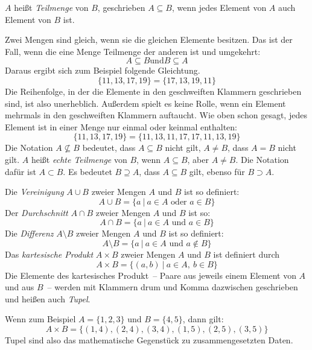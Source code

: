 $A$ heißt \textit{Teilmenge} von $B$, geschrieben $A \subseteq B$, 
wenn jedes Element von $A$ auch Element von $B$ ist.

Zwei Mengen sind gleich, wenn sie die gleichen Elemente besitzen.  Das
ist der Fall, wenn die eine Menge Teilmenge der anderen ist und umgekehrt:
%
\[A \subseteq B \text{und} B \subseteq A\]
%
Daraus ergibt sich zum Beispiel folgende Gleichtung.
%
\[\{11,13,17,19\} =\{17,13,19,11\}\]
%
Die Reihenfolge, in der die Elemente in den geschweiften Klammern
geschrieben sind, ist also unerheblich.  Außerdem spielt es keine
Rolle, wenn ein Element mehrmals in den geschweiften Klammern
auftaucht.  Wie oben schon gesagt, jedes Element ist in einer Menge
nur einmal oder keinmal enthalten:
\[\{11,13,17,19\} = \{11,13,11,17,17,11,13,19\}\]
%
Die Notation $A \not \subseteq B$ bedeutet, dass $A \subseteq B$ nicht gilt, $A
\not = B$, dass $A = B$ nicht gilt. $A$ heißt \emph{echte Teilmenge} von $B$,
wenn $A \subseteq B$, aber $A \not = B$. Die Notation dafür ist $A \subset B$.
Es bedeutet $B \supseteq A$, dass $A \subseteq B$ gilt, ebenso für
$B \supset A$. 

Die \emph{Vereinigung} $A \cup B$ 
zweier Mengen $A$ und $B$ ist so definiert:
\[A \cup B  = \{a\ |\ a \in A \text{ oder } a \in B\}\]
%
Der \emph{Durchschnitt} $A \cap B$ 
zweier Mengen $A$ und $B$ ist so: 
\[A \cap B = \{a\ |\ a \in A \text{ und } a \in B\}\]
%
Die \emph{Differenz} $A \setminus B$ 
zweier Mengen $A$ und $B$ ist so definiert:
\[A \setminus B = \{a\ |\ a \in A \text{ und } a \not \in B\}\]
%
Das \emph{kartesische Produkt} 
  $A \times B$ zweier Mengen 
$A$ und $B$ ist definiert durch
\[ A \times B = \{(a,b)\ |\ a \in A,\ b \in B\}\]
%
Die Elemente des kartesisches Produkt~-- Paare aus jeweils einem
Element von $A$ und aus $B$~-- werden mit Klammern drum und Komma
dazwischen geschrieben und heißen auch
\textit{Tupel}.

Wenn zum Beispiel $A = \{1,2,3\}$ und $B = \{4,5\}$, dann gilt:
\begin{displaymath}
  A\times B = \{ (1,4), (2,4), (3,4), (1,5), (2,5), (3,5) \}
\end{displaymath}
%
Tupel sind also das mathematische Gegenstück zu zusammengesetzten Daten.

